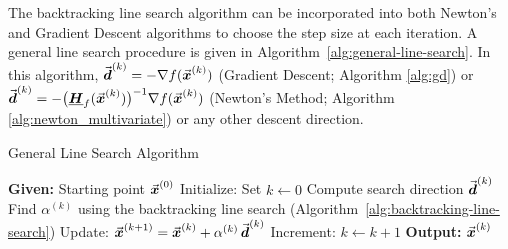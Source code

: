 The backtracking line search algorithm can be incorporated into both Newton's and Gradient Descent algorithms to choose the step size at each iteration. 
A general line search procedure is given in Algorithm~\ref{alg:general-line-search}.
In this algorithm, \(\vec{\boldsymbol{d}}^{(k)} = -\nabla f(\vec{\boldsymbol{x}}^{(k)})\) (Gradient Descent; Algorithm \ref{alg:gd}) or \(\vec{\boldsymbol{d}}^{(k)} = -\big(\underline{\boldsymbol{H}}_{f}(\vec{\boldsymbol{x}}^{(k)})\big)^{-1}\nabla f(\vec{\boldsymbol{x}}^{(k)})\) (Newton's Method; Algorithm \ref{alg:newton_multivariate}) or any other descent direction.


\begin{algorithm}[h]
\caption{General Line Search Algorithm}\label{alg:general-line-search}
\begin{algorithmic}[1]
    \State \textbf{Given:} Starting point \(\vec{\boldsymbol{x}}^{(0)}\)
    \State Initialize: Set \(k \leftarrow 0\)
        \State Compute search direction \(\vec{\boldsymbol{d}}^{(k)}\) 
        \State Find \(\alpha^{(k)}\) using the backtracking line search (Algorithm~\ref{alg:backtracking-line-search})
        \State Update: \(\vec{\boldsymbol{x}}^{(k+1)} = \vec{\boldsymbol{x}}^{(k)} + \alpha^{(k)}\,\vec{\boldsymbol{d}}^{(k)} \)
        \State Increment: \(k \leftarrow k+1\)
    \EndWhile
    \State \textbf{Output:} \(\vec{\boldsymbol{x}}^{(k)}\)
\end{algorithmic}
\end{algorithm}


